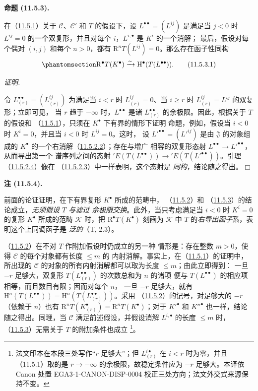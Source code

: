 \documentclass[UTF8,fontset=none,11pt,oneside,openany]{ctexbook}
\providecommand{\square}{\mdlgwhtsquare}
\newcommand{\SourceCorrectionNote}[1]{\footnote{#1}}
\newenvironment{proposition}[1][]{%
  \par\medskip\noindent\textbf{命题 (#1).}\ %
}{\par}
\newenvironment{remark}[1][]{%
  \par\medskip\noindent\textbf{注 (#1).}\ %
}{\par}
\newenvironment{proof}{%
  \par\smallskip\noindent\textit{证明.}\ %
}{\hfill$\square$\par}
\let\EGAOriginalLabel\label
\renewcommand{\label}[1]{\phantomsection\EGAOriginalLabel{#1}}
\begin{document}
\begin{proposition}[11.5.3]
\label{0.11.5.3-fr}
在（\hyperref[0.11.5.1-fr]{11.5.1}）关于 $\mathcal C$、$\mathcal C'$ 和 $T$
的假设下，设 $L^{\bullet\bullet}=(L^{ij})$ 是满足当 $j<0$ 时
$L^{ij}=0$ 的一个双复形，并且对每个 $i$，$L^{i,\bullet}$ 是 $K^i$ 的一个消解；
最后，假设对每个偶对 $(i,j)$ 和每个 $n>0$，都有
$\mathrm R^nT(L^{ij})=0$。那么存在函子性同构
\[
  \label{0.11.5.3.1-fr}
  \mathrm R^\bullet T(K^\bullet)\xrightarrow{\sim}
  \mathrm H^\bullet(T(L^{\bullet\bullet})).
  \tag{11.5.3.1}
\]
\end{proposition}

\begin{proof}
令 $L_{(r)}^{\bullet\bullet}=(L_{(r)}^{ij})$ 为满足当 $i<r$ 时
$L_{(r)}^{ij}=0$、当 $i\geq r$ 时 $L_{(r)}^{ij}=L^{ij}$ 的双复形；立即可见，
当 $r$ 趋于 $-\infty$ 时，$L^{\bullet\bullet}$ 是诸
$L_{(r)}^{\bullet\bullet}$ 的余极限。因此，根据关于 $T$ 的假设和
（\hyperref[0.11.5.1-fr]{11.5.1}），只须在 $K^\bullet$ 下有界的情形下证明
命题，例如，假设当 $i<0$ 时 $K^i=0$，并且当 $i<0$ 时 $L^{ij}=0$。这时，
设 $L'^{\bullet\bullet}=(L'^{ij})$ 是由 $\mathfrak J$ 的对象组成的
$K^\bullet$ 的一个右消解（\hyperref[0.11.5.2.2-fr]{11.5.2.2}）；存在与增广
相容的双复形态射 $L^{\bullet\bullet}\to L'^{\bullet\bullet}$，从而导出第一个
谱序列之间的态射
$'E(T(L^{\bullet\bullet}))\to{}'E(T(L'^{\bullet\bullet}))$。引理
（\hyperref[0.11.5.2.4-fr]{11.5.2.4}）像在
（\hyperref[0.11.5.2.3-fr]{11.5.2.3}）中一样表明，这个态射是
\emph{同构}，结论随之得出。
\end{proof}

\begin{remark}[11.5.4]
\label{0.11.5.4-fr}
前面的论证证明，在下有界复形 $K^\bullet$ 所成的范畴中，
（\hyperref[0.11.5.2-fr]{11.5.2}）和
（\hyperref[0.11.5.3-fr]{11.5.3}）的结论成立，\emph{无须假设 $T$ 与滤过
余极限交换}。此外，当只考虑满足当 $i<0$ 时 $K^i=0$ 的复形 $K^\bullet$
所成的范畴 $\mathcal K$ 时，把 $\mathrm R^\bullet T(K^\bullet)$ 刻画为
$\mathcal K$ 中 $T$ 的\emph{右导出函子}系，表明这个上同调函子是
\emph{泛的}（T, 2.3）。

（\hyperref[0.11.5.2-fr]{11.5.2}）在不对 $T$ 作附加假设时仍成立的另一种
情形是：存在整数 $m>0$，使得 $\mathcal C$ 的每个对象都有长度 $\leq m$ 的
内射消解。事实上，在（\hyperref[0.11.5.1-fr]{11.5.1}）的证明中，所出现的
$\mathcal C$ 的对象的所有内射消解都可以取为长度 $\leq m$；由此立即得到：
一旦 $-r$ 足够大，双复形 $T(L_{(r)}^{\bullet\bullet})$ 的次数总和为 $n$ 的诸项
便与 $T(L^{\bullet\bullet})$ 的相应项相等，而且数目有限；因而对每个 $n$，
一旦 $-r$ 足够大，就有
$\mathrm H^n(T(L^{\bullet\bullet}))=
\mathrm H^n(T(L_{(r)}^{\bullet\bullet}))$。采用
（\hyperref[0.11.5.2-fr]{11.5.2}）的记号，对足够大的 $-r$（依赖于 $n$）也有
$\mathrm R^nT(K_{(r)}^\bullet)=\mathrm R^nT(K^\bullet)$；对于
$K'^\bullet$ 和 $K''^\bullet$ 也一样，结论随之得出。同理，当 $\mathcal C$
满足前述假设，并假设消解 $L^{i,\bullet}$ 的长度 $\leq m$ 时，
（\hyperref[0.11.5.3-fr]{11.5.3}）无需关于 $T$ 的附加条件也成立
\SourceCorrectionNote{法文印本在本段三处写作“$r$ 足够大”；但
$L_{(r)}^{i\bullet}$ 在 $i<r$ 时为零，并且（11.5.1）取的是 $r\to-\infty$
的余极限，故稳定条件应为 $-r$ 足够大。本译依 Canon 处置
EGA3-1-CANON-DISP-0004 校正三处方向；法文外交式来源保持不变。}。
\end{remark}
\end{document}
